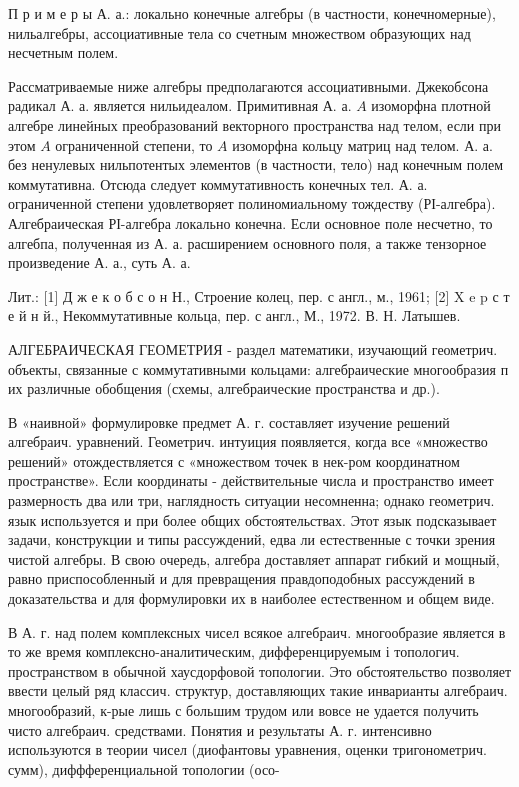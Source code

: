 \documentclass[10pt]{article}
\begin{document}
П р и м е р ы А. а.: локально конечные алгебры (в частности, конечномерные), нильалгебры, ассоциативные тела со счетным множеством образующих над несчетным полем.



Рассматриваемые ниже алгебры предполагаются ассоциативными. Джекобсона радикал А. а. является нильидеалом. Примитивная А. а. $A$ изоморфна плотной алгебре линейных преобразований векторного пространства над телом, если при этом $A$ ограниченной степени, то $A$ изоморфна кольцу матриц над телом. А. а. без ненулевых нильпотентых элементов (в частности, тело) над конечным полем коммутативна. Отсюда следует коммутативность конечных тел. А. а. ограниченной степени удовлетворяет полиномиальному тождеству (РІ-алгебра). Алгебраическая РІ-алгебра локально конечна. Если основное поле несчетно, то алгебпа, полученная из А. а. расширением основного поля, а также тензорное произведение А. а., суть А. а.



Лит.: [1] Д ж е к о б с о н Н., Строение колец, пер. с англ., м., 1961; [2] X e p с т е й н й., Некоммутативные кольца, пер. с англ., М., 1972. В. Н. Латышев.



АЛГЕБРАИЧЕСКАЯ ГЕОМЕТРИЯ - раздел математики, изучающий геометрич. объекты, связанные с коммутативными кольцами: алгебраические многообразия п их различные обобщения (схемы, алгебраические пространства и др.).



В «наивной» формулировке предмет А. г. составляет изучение решений алгебраич. уравнений. Геометрич. интуиция появляется, когда все «множество решений» отождествляется с «множеством точек в нек-ром координатном пространстве». Если координаты - действительные числа и пространство имеет размерность два или три, наглядность ситуации несомненна; однако геометрич. язык используется и при более общих обстоятельствах. Этот язык подсказывает задачи, конструкции и типы рассуждений, едва ли естественные с точки зрения чистой алгебры. В свою очередь, алгебра доставляет аппарат гибкий и мощный, равно приспособленный и для превращения правдоподобных рассуждений в доказательства и для формулировки их в наиболее естественном и общем виде.



В А. г. над полем комплексных чисел всякое алгебраич. многообразие является в то же время комплексно-аналитическим, дифференцируемым і топологич. пространством в обычной хаусдорфовой топологии. Это обстоятельство позволяет ввести целый ряд классич. структур, доставляющих такие инварианты алгебраич. многообразий, к-рые лишь с большим трудом или вовсе не удается получить чисто алгебраич. средствами. Понятия и результаты А. г. интенсивно используются в теории чисел (диофантовы уравнения, оценки тригонометрич. сумм), диффференциальной топологии (осо-
\end{document}

